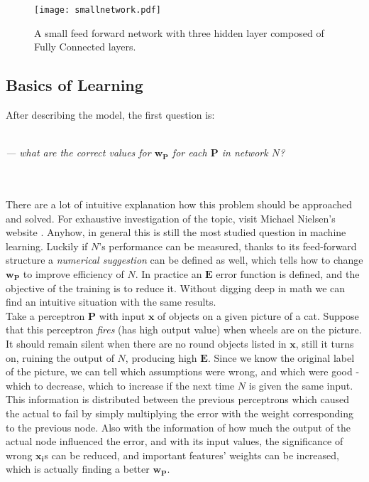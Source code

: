 \begin{figure}
	\centering
	\texttt{[image: smallnetwork.pdf]}
	\caption{A small feed forward network with three hidden layer composed of Fully Connected layers.
	}
	\label{fig:ff}
\end{figure}

\subsection{Basics of Learning}
After describing the model, the first question is:\\ \\
\begin{flushright}
    \emph{--- what are the correct values for $\mathbf{w_P}$ for each $   
    \mathbf{P}$ in network $N$?}
\end{flushright} \\ \\ 
There are a lot of intuitive explanation how this problem should be approached and solved. For exhaustive investigation of the topic, visit Michael Nielsen's website \cite{nnsdl}. 
Anyhow, in general this is still the most studied question in machine learning. 
Luckily if $N$'s performance can be measured, thanks to its feed-forward structure a \emph{numerical suggestion} can be defined as well, which tells how to change $\mathbf{w_P}$ to improve efficiency of $N$. In practice an $\mathbf{E}$ error function is defined, and the objective of the training is to reduce it. Without digging deep in math we can find an intuitive situation with the same results.\\

Take a perceptron $\mathbf{P}$ with input $\mathbf{x}$ of objects on a given picture of a cat. Suppose that this perceptron \emph{fires} (has high output value) when wheels are on the picture. It should remain silent when there are no round objects listed in 
$\mathbf{x}$, still it turns on, ruining the output of $N$, producing high $\mathbf{E}$.
Since we know the original label of the picture, we can tell which assumptions were wrong, and which were good - which to decrease, which to increase if the next time $N$ is given the same input. This information is distributed between the previous perceptrons which caused the actual to fail by simply multiplying the error with the weight corresponding to the previous node. Also with the information of how much the output of the actual node influenced the error, and with its input values, the significance of wrong $\mathbf{x_i}$s can be reduced, and important features' weights can be increased, which is actually finding a better $\mathbf{w_P}$.

